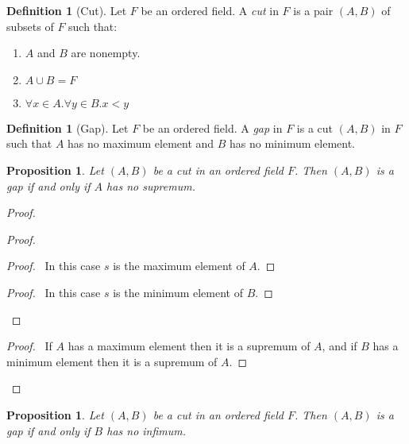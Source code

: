\documentclass{article}
\let\qed\relax
\newtheorem{proposition}[axiom]{Proposition}
\theoremstyle{definition}
\newtheorem{definition}[axiom]{Definition}
\begin{document}
    \begin{definition}[Cut]
        Let $F$ be an ordered field. A \emph{cut} in $F$ is a pair $(A,B)$ of subsets of $F$ such that:
        \begin{enumerate}
            \item $A$ and $B$ are nonempty.
            \item $A \cup B = F$
            \item $\forall x \in A. \forall y \in B. x < y$
        \end{enumerate}
    \end{definition}

    \begin{definition}[Gap]
        Let $F$ be an ordered field. A \emph{gap} in $F$ is a cut $(A,B)$ in $F$ such that $A$ has no
        maximum element and $B$ has no minimum element.
    \end{definition}

    \begin{proposition}
        \label{prop:gap_supremum}
        Let $(A,B)$ be a cut in an ordered field $F$. Then $(A,B)$ is a gap if and only if $A$ has no
        supremum.
    \end{proposition}

    \begin{proof}
        \pf
        \begin{proof}
            \begin{proof}
                \pf\ In this case $s$ is the maximum element of $A$.
            \end{proof}
            \begin{proof}
                \pf\ In this case $s$ is the minimum element of $B$.
            \end{proof}
        \end{proof}
        \begin{proof}
            \pf\ If $A$ has a maximum element then it is a supremum of $A$, and if $B$ has a minimum element
            then it is a supremum of $A$.
        \end{proof}
        \qed
    \end{proof}

    \begin{proposition}
        \label{prop:gap_infimum}
        Let $(A,B)$ be a cut in an ordered field $F$. Then $(A,B)$ is a gap if and only if $B$ has no
        infimum.
    \end{proposition}
\end{document}
